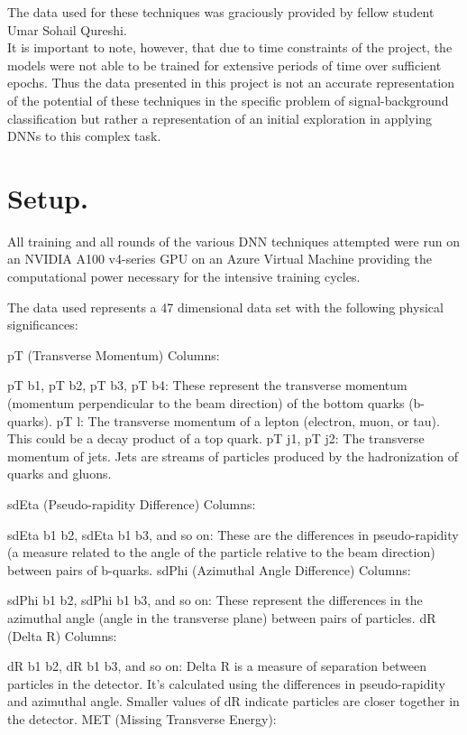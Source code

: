 \documentclass[twocolumn]{webofc}
\begin{document}
The data used for these techniques was graciously provided by fellow student Umar Sohail Qureshi.\\

It is important to note, however, that due to time constraints of the project, the models were not able to be trained for extensive periods of time over sufficient epochs. Thus the data presented in this project is not an accurate representation of the potential of these techniques in the specific problem of signal-background classification but rather a representation of an initial exploration in applying DNNs to this complex task.

\section*{Setup.}\label{sec:readme}
All training and all rounds of the various DNN techniques attempted were run on an NVIDIA A100 v4-series GPU on an Azure Virtual Machine providing the computational power necessary for the intensive training cycles.

The data used represents a 47 dimensional data set with the following physical significances:

pT (Transverse Momentum) Columns:

pT b1, pT b2, pT b3, pT b4: These represent the transverse momentum (momentum perpendicular to the beam direction) of the bottom quarks (b-quarks).
pT l: The transverse momentum of a lepton (electron, muon, or tau). This could be a decay product of a top quark.
pT j1, pT j2: The transverse momentum of jets. Jets are streams of particles produced by the hadronization of quarks and gluons.

sdEta (Pseudo-rapidity Difference) Columns:

sdEta b1 b2, sdEta b1 b3, and so on: These are the differences in pseudo-rapidity (a measure related to the angle of the particle relative to the beam direction) between pairs of b-quarks.
sdPhi (Azimuthal Angle Difference) Columns:

sdPhi b1 b2, sdPhi b1 b3, and so on: These represent the differences in the azimuthal angle (angle in the transverse plane) between pairs of particles.
dR (Delta R) Columns:

dR b1 b2, dR b1 b3, and so on: Delta R is a measure of separation between particles in the detector. It's calculated using the differences in pseudo-rapidity and azimuthal angle. Smaller values of dR indicate particles are closer together in the detector.
MET (Missing Transverse Energy):
\end{document}
